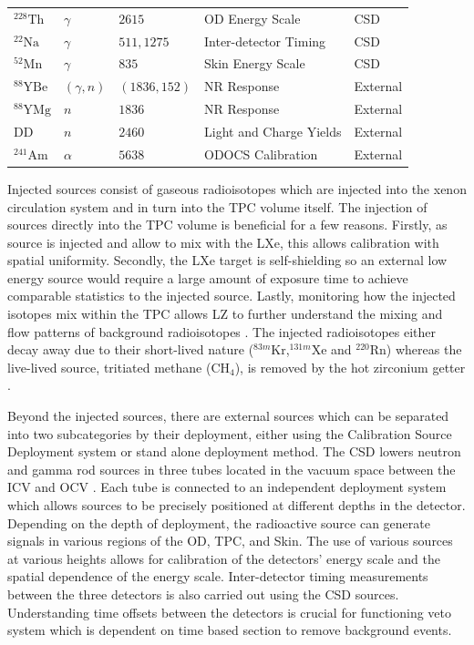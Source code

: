 \begin{table}[!ht]
\begin{tabular}{lllll}
         $^{228}\text{Th}$& $\gamma$ & $2615$ &OD Energy Scale & CSD\\
         $^{22}\text{Na}$& $\gamma$ & $511, 1275$ &Inter-detector Timing & CSD\\
         $^{52}\text{Mn}$& $\gamma$ & $835$ &Skin Energy Scale & CSD\\
         $^{88}\text{YBe}$& $(\gamma,n)$ & $(1836,152)$ &NR Response & External\\
         $^{88}\text{YMg}$& $n$ & $1836$ & NR Response & External\\
         DD& $n$ & $2460$ & Light and Charge Yields & External\\
         $^{241}\text{Am}$& $\alpha$ & $5638$ &ODOCS Calibration & External\\
         \hline\hline
    \end{tabular}
    \label{tab:LZ/CalibrationSources}
\end{table}
Injected sources consist of gaseous radioisotopes which are injected into the xenon circulation system and in turn into the TPC volume itself. The injection of sources directly into the TPC volume is beneficial for a few reasons. Firstly, as source is injected and allow to mix with the LXe, this allows calibration with spatial uniformity. Secondly, the LXe target is self-shielding so an external low energy source would require a large amount of exposure time to achieve comparable statistics to the injected source. Lastly, monitoring how the injected isotopes mix within the TPC allows LZ to further understand the mixing and flow patterns of background radioisotopes \cite{LZ:2024bsz}. The injected radioisotopes either decay away due to their short-lived nature ($^{83m}\text{Kr}$,$^{131m}\text{Xe}$ and $^{220}\text{Rn}$) whereas the live-lived source, tritiated methane ($\text{CH}_4$), is removed by the hot zirconium getter \cite{LZNIMA}.

Beyond the injected sources, there are external sources which can be separated into two subcategories by their deployment, either using the Calibration Source Deployment system or stand alone deployment method. The CSD lowers neutron and gamma rod sources in three tubes located in the vacuum space between the ICV and OCV \cite{LZNIMA}. Each tube is connected to an independent deployment system which allows sources to be precisely positioned at different depths in the detector. Depending on the depth of deployment, the radioactive source can generate signals in various regions of the OD, TPC, and Skin. The use of various sources at various heights allows for calibration of the detectors' energy scale and the spatial dependence of the energy scale. Inter-detector timing measurements between the three detectors is also carried out using the CSD sources. Understanding time offsets between the detectors is crucial for functioning veto system which is dependent on time based section to remove background events.

